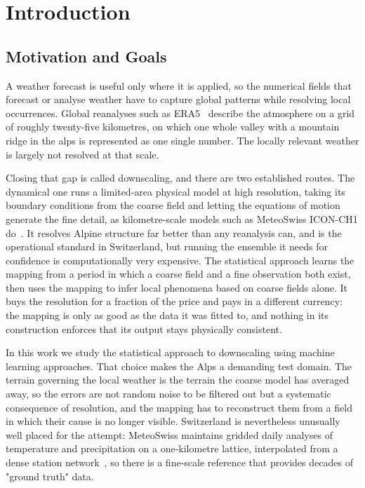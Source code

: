 \chapter{Introduction}\label{ch:introduction}

\section{Motivation and Goals}\label{sec:intro-motivation}

A weather forecast is useful only where it is applied, so the numerical fields that forecast or analyse weather have to capture global patterns while resolving local occurrences. Global reanalyses such as ERA5~\cite{hersbach2020era5} describe the atmosphere on a grid of roughly twenty-five kilometres, on which one whole valley with a mountain ridge in the alps is represented as one single number. The locally relevant weather is largely not resolved at that scale. 

Closing that gap is called downscaling, and there are two established routes. The dynamical one runs a limited-area physical model at high resolution, taking its boundary conditions from the coarse field and letting the equations of motion generate the fine detail, as kilometre-scale models such as MeteoSwiss ICON-CH1 do~\cite{meteoswiss_icon}. It resolves Alpine structure far better than any reanalysis can, and is the operational standard in Switzerland, but running the ensemble it needs for confidence is computationally very expensive. The statistical approach learns the mapping from a period in which a coarse field and a fine observation both exist, then uses the mapping to infer local phenomena based on coarse fields alone. It buys the resolution for a fraction of the price and pays in a different currency: the mapping is only as good as the data it was fitted to, and nothing in its construction enforces that its output stays physically consistent. 

In this work we study the statistical approach to downscaling using machine learning approaches. That choice makes the Alps a demanding test domain. The terrain governing the local weather is the terrain the coarse model has averaged away, so the errors are not random noise to be filtered out but a systematic consequence of resolution, and the mapping has to reconstruct them from a field in which their cause is no longer visible. Switzerland is nevertheless unusually well placed for the attempt: MeteoSwiss maintains gridded daily analyses of temperature and precipitation on a one-kilometre lattice, interpolated from a dense station network~\cite{frei2014temperature, frei1998precip}, so there is a fine-scale reference that provides decades of "ground truth" data.


